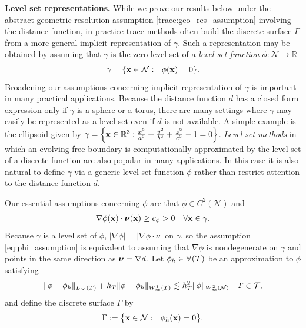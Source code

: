 \medskip\noindent
{\bf Level set representations.}
While we prove our results below under the abstract geometric resolution assumption \eqref{trace:geo_res_assumption} involving the distance function, in practice trace methods often build the discrete surface $\Gamma$ from a more general implicit representation of $\gamma$.   Such a representation may be obtained by assuming that $\gamma$ is the zero level set of a {\it level-set function} $\phi:\mathcal{N} \rightarrow \mathbb{R}$
%
$$\gamma=\{{\bf x} \in \mathcal{N}: ~~ \phi({\bf x})=0\}.$$
%
Broadening our assumptions concerning implicit representation of $\gamma$ is important in many practical applications.  Because the distance function $d$ has a closed form expression only if $\gamma$ is a sphere or a torus, there are many settings where $\gamma$ may easily be represented as a level set even if $d$ is not available. A simple example is the ellipsoid given by $\gamma=\left \{{\bf x} \in \mathbb{R}^3: \frac{x^2}{a^2}+\frac{y^2}{b^2}+\frac{z^2}{c^2}-1=0 \right \}$.  {\it Level set methods} in which an evolving free boundary is computationally approximated by the level set of a discrete function are also popular in many applications.  In this case it is also natural to define $\gamma$ via a generic level set function $\phi$ rather than restrict attention to the distance function $d$.  

Our essential assumptions concerning $\phi$ are that $\phi \in C^2(\mathcal{N})$ and 
\begin{align}
\label{eq:phi_assumption}
\nabla \phi({\bf x}) \cdot {\boldsymbol \nu}({\bf x}) \ge c_\phi >0 \quad \forall {\bf x} \in \gamma.
\end{align}
Because $\gamma$ is a level set of $\phi$, $|\nabla \phi|=|\nabla \phi \cdot \nu|$ on $\gamma$, so the assumption \eqref{eq:phi_assumption} is equivalent to assuming that $\nabla \phi$ is nondegenerate on $\gamma$ and points in the same direction as ${\boldsymbol \nu}=\nabla d$. Let $\phi_h \in \mathbb{V}(\mathcal T)$ be an approximation to $\phi$ satisfying 
%
\begin{align}
\label{eq:phih_assumption}
\|\phi-\phi_h\|_{L_\infty(T)} + h_T\|\phi-\phi_h\|_{W_\infty^1(T)}
  \lesssim h_T^2 \|\phi\|_{W^2_\infty(\mathcal{N})}
\quad T \in \mathcal{T}, 
\end{align}
%
and define the discrete surface $\Gamma$ by 
%
$$\Gamma : = \big\{{\bf x} \in \mathcal{N}: ~~ \phi_h({\bf x})=0 \big\}.$$

